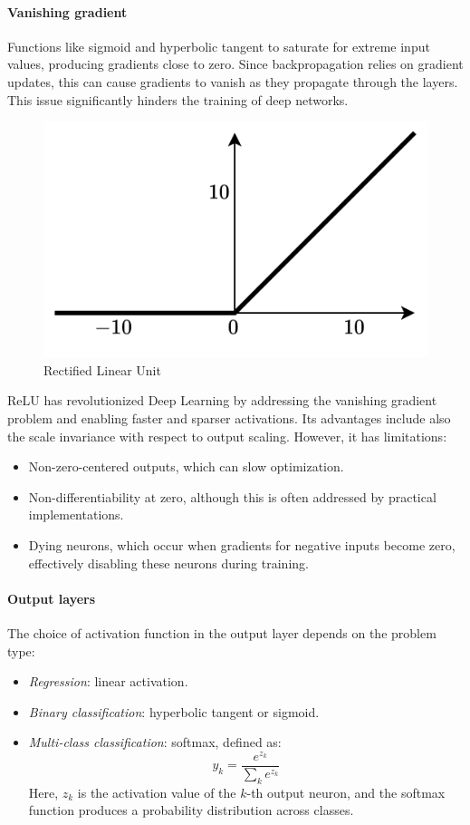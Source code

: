 \paragraph*{Vanishing gradient}
Functions like sigmoid and hyperbolic tangent to saturate for extreme input values, producing gradients close to zero. 
Since backpropagation relies on gradient updates, this can cause gradients to vanish as they propagate through the layers.
This issue significantly hinders the training of deep networks.
\begin{figure}[H]
    \centering
    \includegraphics[width=0.5\linewidth]{images/ReLU.png}
    \caption{Rectified Linear Unit}
\end{figure}
\noindent ReLU has revolutionized Deep Learning by addressing the vanishing gradient problem and enabling faster and sparser activations.
Its advantages include also the scale invariance with respect to output scaling.
\noindent However, it has limitations:
\begin{itemize}
    \item Non-zero-centered outputs, which can slow optimization.
    \item Non-differentiability at zero, although this is often addressed by practical implementations.
    \item Dying neurons, which occur when gradients for negative inputs become zero, effectively disabling these neurons during training.
\end{itemize}

\paragraph*{Output layers}
The choice of activation function in the output layer depends on the problem type:
\begin{itemize}
    \item \textit{Regression}: linear activation.
    \item \textit{Binary classification}: hyperbolic tangent or sigmoid. 
    \item \textit{Multi-class classification}: softmax, defined as:
        \[y_k=\dfrac{e^{z_k}}{\sum_ke^{z_k}}\]
        Here, $z_k$ is the activation value of the $k$-th output neuron, and the softmax function produces a probability distribution across classes.
\end{itemize}

